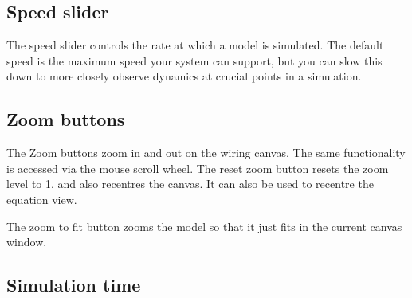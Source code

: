 %
%
%
%
%
%
%

\subsection{Speed slider}
\label{Speedslider}

\begin{center}
\end{center}

The speed slider controls the rate at which a model is simulated. The
default speed is the maximum speed your system can support, but you
can slow this down to more closely observe dynamics at crucial points
in a simulation.

\subsection{Zoom buttons}
\label{ZoomButtons}

\begin{center}
\end{center}

The Zoom buttons zoom in and out on the wiring canvas. The same functionality
is accessed via the mouse scroll wheel. The reset zoom button
 resets the zoom level to 1, and also
recentres the canvas. It can also be used to recentre the equation
view.

The zoom to fit button zooms the model so that it just fits in the
current canvas window.

\subsection{Simulation time}
\label{SimTime}

